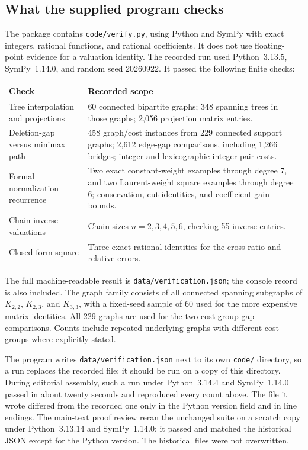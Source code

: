 \documentclass[11pt,a4paper]{article}
\numberwithin{equation}{section}
\theoremstyle{definition}
\begin{document}
\subsection{What the supplied program checks}
The package contains \texttt{code/verify.py}, using Python and SymPy
with exact integers, rational functions, and rational coefficients.
It does not use floating-point evidence for a valuation identity.
The recorded run used Python~3.13.5, SymPy~1.14.0, and random seed
20260922. It passed the following finite checks:
\begin{center}
\begin{tabular}{@{}L{0.39\textwidth}L{0.53\textwidth}@{}}
\toprule
Check & Recorded scope\\
\midrule
Tree interpolation and projections &
60 connected bipartite graphs; 348 spanning trees in those graphs;
2,056 projection matrix entries.\\[3pt]
Deletion-gap versus minimax path &
458 graph/cost instances from 229 connected support graphs;
2,612 edge-gap comparisons, including 1,266 bridges;
integer and lexicographic integer-pair costs.\\[3pt]
Formal normalization recurrence &
Two exact constant-weight examples through degree 7, and two
Laurent-weight square examples through degree 6;
conservation, cut identities, and coefficient gain bounds.\\[3pt]
Chain inverse valuations &
Chain sizes $n=2,3,4,5,6$, checking 55 inverse entries.\\[3pt]
Closed-form square &
Three exact rational identities for the cross-ratio and relative
errors.\\
\bottomrule
\end{tabular}
\end{center}
The full machine-readable result is
\texttt{data/verification.json}; the console record is also included.
The graph family consists of all connected spanning subgraphs of
$K_{2,2}$, $K_{2,3}$, and $K_{3,3}$, with a fixed-seed sample of 60
used for the more expensive matrix identities. All 229 graphs are
used for the two cost-group gap comparisons. Counts include repeated
underlying graphs with different cost groups where explicitly stated.

The program writes \texttt{data/verification.json} next to its own
\texttt{code/} directory, so a run replaces the recorded file; it should be
run on a copy of this directory. During editorial assembly, such a run under
Python~3.14.4 and SymPy~1.14.0 passed in about twenty seconds and
reproduced every count above. The file it wrote differed from the recorded
one only in the Python version field and in line endings. The main-text
proof review reran the unchanged suite on a scratch copy under Python~3.13.14
and SymPy~1.14.0; it passed and matched the historical JSON except for the
Python version. The historical files were not overwritten.
\end{document}
